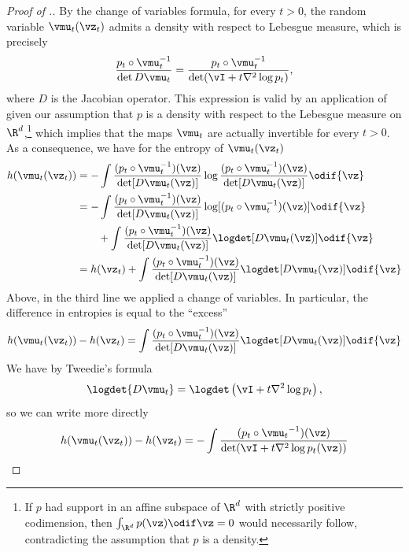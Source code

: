 \documentclass[../../book-main.tex]{subfiles}
\begin{document}
\begin{proof}[Proof of {}.]
  By the change of variables formula, for every $t>0$, the random variable
  $\vmu_t(\vz_t)$ admits a density with respect to Lebesgue measure, which is
  precisely
  \begin{equation*}
    \frac{p_t \circ \vmu_t^{-1}}{\det D \vmu_t}
    =
    \frac{p_t \circ \vmu_t^{-1}}{\det(\vI + t \nabla^2 \log p_t)},
  \end{equation*}
  where \(D\) is the Jacobian operator.
  This expression is valid by an application of \cite[Lemma
  II.1]{Gribonval2011-pf} given our assumption that $p$ is a density with respect
  to the Lebesgue measure on $\R^d$,\footnote{If $p$ had support in an affine
  subspace of $\R^d$ with strictly positive codimension, then $\int_{\R^d}
  p(\vz)\odif \vz = 0$ would necessarily follow, contradicting the assumption that $p$ is
  a density.} which implies
  that the maps $\vmu_t$ are actually invertible for every $t>0$. As
  a consequence, we have for the entropy of $\vmu_t(\vz_t)$
  \begin{align*}
    h(\vmu_t(\vz_t))
    &=
    - \int \frac{(p_t \circ \vmu_t^{-1})(\vz)}{\det[D \vmu_t(\vz)]}
    \log \frac{(p_t \circ \vmu_t^{-1})(\vz)}{\det[D \vmu_t(\vz)]}\odif{\vz}
    \\
    &=
    - \int \frac{(p_t \circ \vmu_t^{-1})(\vz)}{\det[D\vmu_t(\vz)]}
    \log[(p_t \circ \vmu_t^{-1})(\vz)]\odif{\vz} \\
    &\qquad +
    \int \frac{(p_t \circ \vmu_t^{-1})(\vz)}{\det[D\vmu_t(\vz)]}
    \logdet[D\vmu_t(\vz)]\odif{\vz}
    \\
    &=
    h(\vz_t)
    +
    \int \frac{(p_t \circ \vmu_t^{-1})(\vz)}{\det[D\vmu_t(\vz)]}
    \logdet[D\vmu_t(\vz)]\odif{\vz}
  \end{align*}
  Above, in the third line we applied a change of variables.
  In particular, the difference in entropies is equal to the ``excess''
  \begin{equation*}
    h(\vmu_t(\vz_t))
    -
    h(\vz_t)
    =
    \int \frac{(p_t \circ \vmu_t^{-1})(\vz)}{\det[D\vmu_t(\vz)]}
    \logdet[D\vmu_t(\vz)]\odif{\vz}
  \end{equation*}
  We have by Tweedie's formula
  \begin{equation*}
    \logdet {D \vmu_t}
    =
    \logdet \left(
      \vI + t \nabla^2\log p_t
    \right),
  \end{equation*}
  so we can write more directly
  \begin{equation*}
    h(\vmu_t(\vz_t))
    -
    h(\vz_t)
    =
    -\int
    \frac{(p_t \circ {\vmu_t}^{-1})(\vz)}{\det( \vI + t \nabla^2 \log p_t(\vz))}

\end{equation*}
\end{proof}
\end{document}
